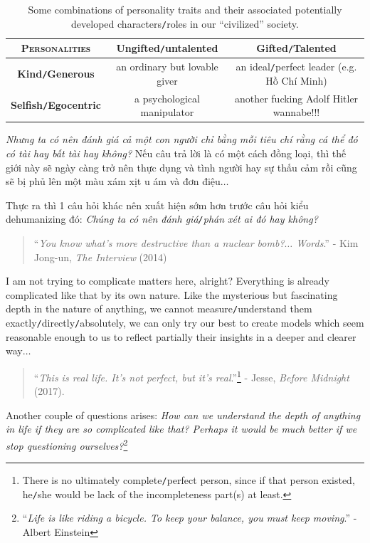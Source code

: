 \documentclass[12pt]{article}
\numberwithin{equation}{section}
\begin{document}
\begin{table}[h]
    \centering
    \begin{tabular}{|c|c|c|}
        \hline
        \textsc{Personalities}& \textbf{Ungifted\texttt{/}untalented} & \textbf{Gifted\texttt{/}Talented} \\
        \hline
        \textbf{Kind\texttt{/}Generous} & an ordinary but lovable giver & an ideal\texttt{/}perfect leader (e.g. Hồ Chí Minh) \\
        \hline
        \textbf{Selfish\texttt{/}Egocentric} & a psychological manipulator & another fucking Adolf Hitler wannabe!!! \\
        \hline
    \end{tabular}
    \caption{Some combinations of personality traits and their associated potentially developed characters\texttt{/}roles in our ``civilized'' society.}
\end{table}
\textit{Nhưng ta có nên đánh giá cả một con người chỉ bằng mỗi tiêu chí rằng cá thể đó có tài hay bất tài hay không?} Nếu câu trả lời là có một cách đồng loại, thì thế giới này sẽ ngày càng trở nên thực dụng và tình người hay sự thấu cảm rồi cũng sẽ bị phủ lên một màu xám xịt u ám và đơn điệu$\ldots$

Thực ra thì 1 câu hỏi khác nên xuất hiện sớm hơn trước câu hỏi kiểu dehumanizing đó: \textit{Chúng ta có nên đánh giá\texttt{/}phán xét ai đó hay không?}
\begin{quotation}
    ``\textit{You know what's more destructive than a nuclear bomb?$\ldots$ Words}.'' - Kim Jong-un, \textit{The Interview} (2014)
\end{quotation}
I am not trying to complicate matters here, alright? Everything is already complicated like that by its own nature. Like the mysterious but fascinating depth in the nature of anything, we cannot measure\texttt{/}understand them exactly\texttt{/}directly\texttt{/}absolutely, we can only try our best to create models which seem reasonable enough to us to reflect partially their insights in a deeper and clearer way$\ldots$

\begin{quotation}
    ``\textit{This is real life. It's not perfect, but it's real}.''\footnote{There is no ultimately complete\texttt{/}perfect person, since if that person existed, he\texttt{/}she would be lack of the incompleteness part(s) at least.} - Jesse, \textit{Before Midnight} (2017).
\end{quotation}
Another couple of questions arises: \textit{How can we understand the depth of anything in life if they are so complicated like that? Perhaps it would be much better if we stop questioning ourselves?}\footnote{``\textit{Life is like riding a bicycle. To keep your balance, you must keep moving}.'' - Albert Einstein}
\end{document}
